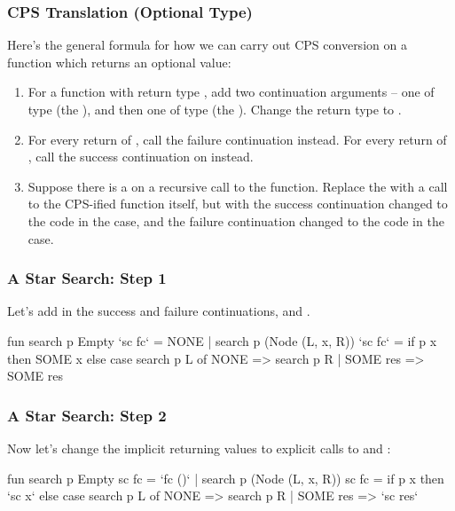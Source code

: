 \documentclass[aspectratio=169, handout]{beamer}
\begin{document}
\begin{frame}[fragile]
  \frametitle{CPS Translation (Optional Type)}

  Here's the general formula for how we can carry out CPS conversion on a function
  which returns an optional value:

  \pause
  \begin{enumerate}
    \item For a function with return type , add two continuation
    arguments -- one of type  (the ),
    and then one of type  (the ).
    Change the return type to . \pause
    \item For every return of , call the failure continuation instead.
    For every return of , call the success continuation on 
    instead. \pause
    \item Suppose there is a  on a recursive call to the function.
    Replace the  with a call to the CPS-ified function itself, but
    with the success continuation changed to the code in the  case,
    and the failure continuation changed to the code in the  case.
  \end{enumerate}
\end{frame}

\begin{frame}[fragile]
  \frametitle{A Star Search: Step 1}

  Let's add in the success and failure continuations,  and .

  \pause
  \vspace{\fill}

  \begin{codeblock}
    fun search p Empty `sc fc` = NONE
      | search p (Node (L, x, R)) `sc fc` =
          if p x then
            SOME x
          else
            case search p L of
              NONE => search p R
            | SOME res => SOME res
  \end{codeblock}
\end{frame}

\begin{frame}[fragile]
  \frametitle{A Star Search: Step 2}

  Now let's change the implicit returning values to explicit calls to
   and :

  \pause
  \vspace{\fill}

  \begin{codeblock}
    fun search p Empty sc fc = `fc ()`
      | search p (Node (L, x, R)) sc fc =
          if p x then
            `sc x`
          else
            case search p L of
              NONE => search p R
            | SOME res => `sc res`
  \end{codeblock}
\end{frame}
\end{document}
